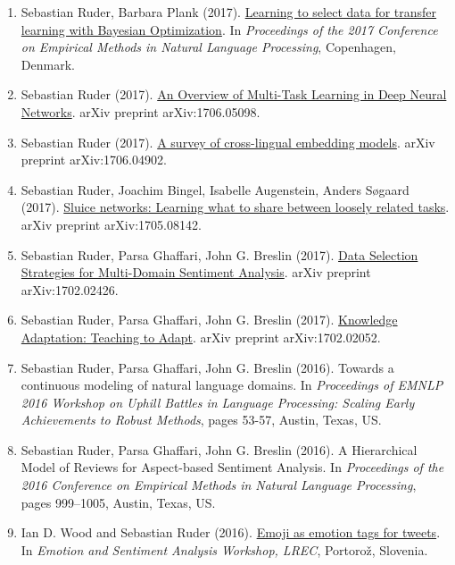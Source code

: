\documentclass[10pt,letterpaper]{article}
\begin{document}
\begin{enumerate}
	\parskip=0.1em
	
	\item Sebastian Ruder, Barbara Plank (2017). \href{https://arxiv.org/abs/1707.05246}{Learning to select data for transfer learning with Bayesian Optimization}. In \textit{Proceedings of the 2017 Conference on Empirical Methods in Natural Language Processing}, Copenhagen, Denmark.
	
	\item Sebastian Ruder (2017). \href{https://arxiv.org/abs/1706.05098}{An Overview of Multi-Task Learning in Deep Neural Networks}. arXiv preprint arXiv:1706.05098.

	\item Sebastian Ruder (2017). \href{https://arxiv.org/abs/1706.04902}{A survey of cross-lingual embedding models}. arXiv preprint arXiv:1706.04902.
	
	\item Sebastian Ruder, Joachim Bingel, Isabelle Augenstein, Anders Søgaard (2017). \href{https://arxiv.org/abs/1705.08142}{Sluice networks: Learning what to share between loosely related tasks}. arXiv preprint arXiv:1705.08142.
	
	\item Sebastian Ruder, Parsa Ghaffari, John G. Breslin (2017). \href{https://arxiv.org/abs/1702.02426}{Data Selection Strategies for Multi-Domain Sentiment Analysis}. arXiv preprint arXiv:1702.02426.
	
	\item Sebastian Ruder, Parsa Ghaffari, John G. Breslin (2017). \href{https://arxiv.org/abs/1702.02052}{Knowledge Adaptation: Teaching to Adapt}. arXiv preprint arXiv:1702.02052.
	
	\item Sebastian Ruder, Parsa Ghaffari, John G. Breslin (2016). Towards a continuous modeling of natural language domains. In \textit{Proceedings of EMNLP 2016 Workshop on Uphill Battles in Language Processing: Scaling Early Achievements to Robust Methods}, pages 53-57, Austin, Texas, US.
	
	\item Sebastian Ruder, Parsa Ghaffari, John G. Breslin (2016). A Hierarchical Model of Reviews for Aspect-based Sentiment Analysis. In \textit{Proceedings of the 2016 Conference on Empirical Methods in Natural Language Processing}, pages 999–1005, Austin, Texas, US.
	
	\item Ian D. Wood and Sebastian Ruder (2016). \href{http://gsi.dit.upm.es/esa2016/Proceedings-ESA2016.pdf}{Emoji as emotion tags for tweets}. In \textit{Emotion and Sentiment Analysis Workshop, LREC}, Portorož, Slovenia.
	

\end{enumerate}
\end{document}
